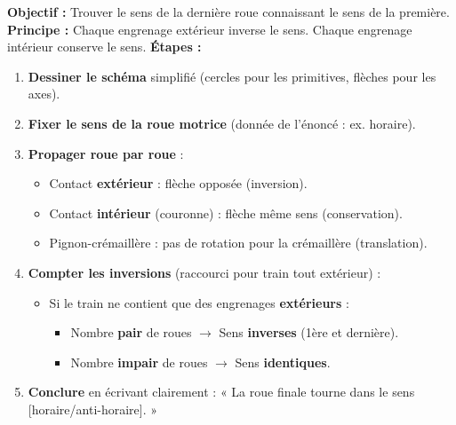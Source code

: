 \documentclass[11pt]{article}
\begin{document}
\begin{methode}
\textbf{Objectif :} Trouver le sens de la dernière roue connaissant le sens de la première.
\textbf{Principe :} Chaque engrenage extérieur inverse le sens. Chaque engrenage intérieur conserve le sens.
\textbf{Étapes :}
\begin{enumerate}
\item \textbf{Dessiner le schéma} simplifié (cercles pour les primitives, flèches pour les axes).
\item \textbf{Fixer le sens de la roue motrice} (donnée de l'énoncé : ex. horaire).
\item \textbf{Propager roue par roue} :
  \begin{itemize}
  \item Contact \textbf{extérieur} : flèche opposée (inversion).
  \item Contact \textbf{intérieur} (couronne) : flèche même sens (conservation).
  \item Pignon-crémaillère : pas de rotation pour la crémaillère (translation).
  \end{itemize}
\item \textbf{Compter les inversions} (raccourci pour train tout extérieur) :
  \begin{itemize}
  \item Si le train ne contient que des engrenages \textbf{extérieurs} :
    \begin{itemize}
    \item Nombre \textbf{pair} de roues $\rightarrow$ Sens \textbf{inverses} (1ère et dernière).
    \item Nombre \textbf{impair} de roues $\rightarrow$ Sens \textbf{identiques}.
    \end{itemize}
  \end{itemize}
\item \textbf{Conclure} en écrivant clairement : « La roue finale tourne dans le sens [horaire/anti-horaire]. »
\end{enumerate}
\end{methode}
\end{document}
